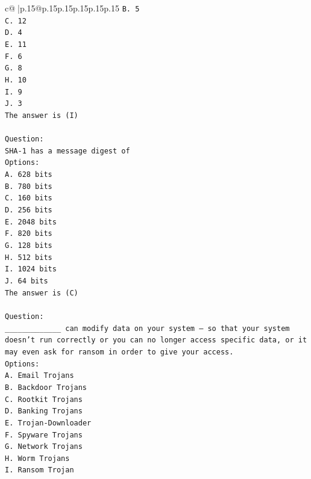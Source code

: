 \documentclass{article}
\begin{document}
{\begin{supertabular}{c@{$\;$}|p{.15\linewidth}@{}p{.15\linewidth}p{.15\linewidth}p{.15\linewidth}p{.15\linewidth}p{.15\linewidth}}
{{{\texttt{B. 5} \\
\texttt{C. 12} \\
\texttt{D. 4} \\
\texttt{E. 11} \\
\texttt{F. 6} \\
\texttt{G. 8} \\
\texttt{H. 10} \\
\texttt{I. 9} \\
\texttt{J. 3} \\
\texttt{The answer is (I)} \\
\\ 
\texttt{Question:} \\
\texttt{SHA{-}1 has a message digest of} \\
\texttt{Options:} \\
\texttt{A. 628 bits} \\
\texttt{B. 780 bits} \\
\texttt{C. 160 bits} \\
\texttt{D. 256 bits} \\
\texttt{E. 2048 bits} \\
\texttt{F. 820 bits} \\
\texttt{G. 128 bits} \\
\texttt{H. 512 bits} \\
\texttt{I. 1024 bits} \\
\texttt{J. 64 bits} \\
\texttt{The answer is (C)} \\
\\ 
\texttt{Question:} \\
\texttt{\_\_\_\_\_\_\_\_\_\_\_\_\_ can modify data on your system – so that your system doesn’t run correctly or you can no longer access specific data, or it may even ask for ransom in order to give your access.} \\
\texttt{Options:} \\
\texttt{A. Email Trojans} \\
\texttt{B. Backdoor Trojans} \\
\texttt{C. Rootkit Trojans} \\
\texttt{D. Banking Trojans} \\
\texttt{E. Trojan{-}Downloader} \\
\texttt{F. Spyware Trojans} \\
\texttt{G. Network Trojans} \\
\texttt{H. Worm Trojans} \\
\texttt{I. Ransom Trojan} \\
}}}
\end{supertabular}}
\end{document}
